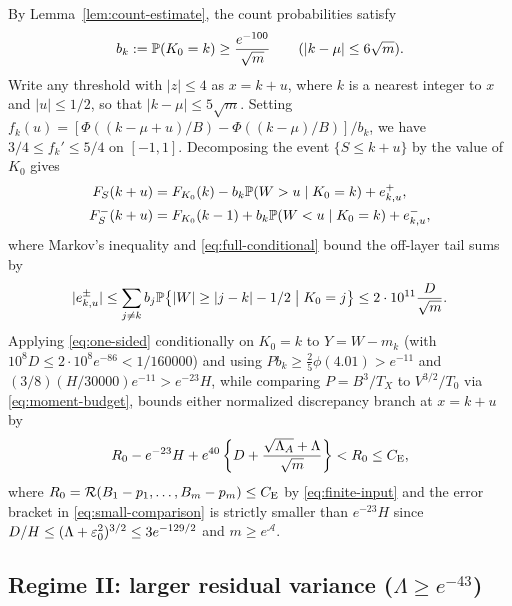 By Lemma~\ref{lem:count-estimate}, the count probabilities satisfy
\begin{equation}\label{eq:central-count}
 b_k:=\mathbb P(K_0=k)\ge \frac{e^{-100}}{\sqrt m}
                         \qquad(|k-\mu|\le6\sqrt m).
\end{equation}
Write any threshold with $|z|\le4$ as $x=k+u$, where $k$ is a nearest
integer to $x$ and $|u|\le1/2$, so that $|k-\mu|\le5\sqrt m$. Setting
$f_k(u)=[\Phi((k-\mu+u)/B)-\Phi((k-\mu)/B)]/b_k$, we have $3/4\le f_k'\le5/4$
on $[-1,1]$. Decomposing the event $\{S\le k+u\}$ by the value of $K_0$ gives
\begin{align}
 F_S(k+u)&=F_{K_0}(k)-b_k\mathbb P(W>u\mid K_0=k)+e^+_{k,u},\notag\\
 F_S^-(k+u)&=F_{K_0}(k-1)+b_k\mathbb P(W<u\mid K_0=k)+e^-_{k,u},
                                                        \label{eq:layers}
\end{align}
where Markov's inequality and \eqref{eq:full-conditional} bound the off-layer
tail sums by
\[
 |e^\pm_{k,u}|\le\sum_{j\ne k}b_j\mathbb P\bigl\{|W|\ge|j-k|-1/2\bigm| K_0=j\bigr\}
                         \le2\cdot10^{11}\frac{D}{\sqrt m}.
\]
Applying \eqref{eq:one-sided} conditionally on $K_0=k$ to $Y=W-m_k$ (with
$10^8D\le2\cdot10^8e^{-86}<1/160000$) and using $Pb_k\ge\frac25\phi(4.01)>e^{-11}$
and $(3/8)(H/30000)e^{-11}>e^{-23}H$, while comparing $P=B^3/T_X$ to
$V^{3/2}/T_0$ via \eqref{eq:moment-budget}, bounds either normalized
discrepancy branch at $x=k+u$ by
\begin{equation}\label{eq:small-comparison}
 R_0-e^{-23}H+e^{40}
           \left\{D+\frac{\sqrt{\Lambda_A}+\Lambda}{\sqrt m}\right\}
 <R_0\le C_{\mathrm E},
\end{equation}
where $R_0=\mathcal R(B_1-p_1,\ldots,B_m-p_m)\le C_{\mathrm E}$ by \eqref{eq:finite-input}
and the error bracket in \eqref{eq:small-comparison} is strictly smaller
than $e^{-23}H$ since $D/H\le(\Lambda+\varepsilon_0^2)^{3/2}\le3e^{-129/2}$ and
$m\ge e^{\mathcal A}$.

\subsection{Regime II: larger residual variance ($\Lambda\ge e^{-43}$)}
\label{subsec:large-residual}

